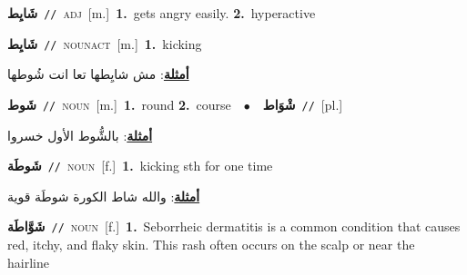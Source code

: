 \documentclass[10pt,a4paper,twoside]{article} %
\begin{document}
\begin{multicols}{2}
{\setlength\topsep{0pt}\textbf{\foreignlanguage{arabic}{شَايِط}}\ {\color{gray}\texttt{//}\color{black}}\ \textsc{adj}\ [m.]\ \textbf{1.}~gets angry easily.  \textbf{2.}~hyperactive\ } \vspace{2mm}

{\setlength\topsep{0pt}\textbf{\foreignlanguage{arabic}{شَايِط}}\ {\color{gray}\texttt{//}\color{black}}\ \textsc{noun\textunderscore act}\ [m.]\ \textbf{1.}~kicking\  \begin{flushright}\color{gray}\foreignlanguage{arabic}{\textbf{\underline{\foreignlanguage{arabic}{أمثلة}}}: مش شايِطها تعا انت شُوطها}\end{flushright}\color{black}} \vspace{2mm}

{\setlength\topsep{0pt}\textbf{\foreignlanguage{arabic}{شَوط}}\ {\color{gray}\texttt{//}\color{black}}\ \textsc{noun}\ [m.]\ \textbf{1.}~round  \textbf{2.}~course\ \ $\bullet$\ \ \setlength\topsep{0pt}\textbf{\foreignlanguage{arabic}{شْوَاط}}\ {\color{gray}\texttt{//}\color{black}}\ [pl.]\  \begin{flushright}\color{gray}\foreignlanguage{arabic}{\textbf{\underline{\foreignlanguage{arabic}{أمثلة}}}: بالشُّوط الأول خسروا}\end{flushright}\color{black}} \vspace{2mm}

{\setlength\topsep{0pt}\textbf{\foreignlanguage{arabic}{شَوطَة}}\ {\color{gray}\texttt{//}\color{black}}\ \textsc{noun}\ [f.]\ \textbf{1.}~kicking sth for one time\  \begin{flushright}\color{gray}\foreignlanguage{arabic}{\textbf{\underline{\foreignlanguage{arabic}{أمثلة}}}: والله شاط الكورة شوطَة قوية}\end{flushright}\color{black}} \vspace{2mm}

{\setlength\topsep{0pt}\textbf{\foreignlanguage{arabic}{شَوَّاطَة}}\ {\color{gray}\texttt{//}\color{black}}\ \textsc{noun}\ [f.]\ \textbf{1.}~Seborrheic dermatitis is a common condition that causes red, itchy, and flaky skin. This rash often occurs on the scalp or near the hairline\ } \vspace{2mm}


\end{multicols}
\end{document}
